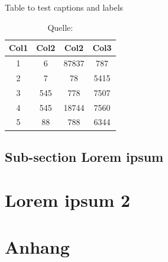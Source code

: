 \documentclass{hwz}
\begin{document}
\lipsum[2]

\begin{table}[h]
\centering
\caption{Table to test captions and labels}
\label{table:1}
\begin{tabular}{||c c c c||} 
 \hline
 Col1 & Col2 & Col2 & Col3 \\ [0.5ex] 
 \hline\hline
 1 & 6 & 87837 & 787 \\ 
 2 & 7 & 78 & 5415 \\
 3 & 545 & 778 & 7507 \\
 4 & 545 & 18744 & 7560 \\
 5 & 88 & 788 & 6344 \\ [1ex] 
 \hline
\end{tabular}
\caption*{Quelle: \textcite{BundesamtfurStatistik2018Finanzierung}}
\end{table}
\newpage

\subsection{Sub-section Lorem ipsum}

\lipsum[2]

\newpage

\section{Lorem ipsum 2}

\lipsum[2]

\newpage

\section{Anhang}


\newpage

\end{document}
